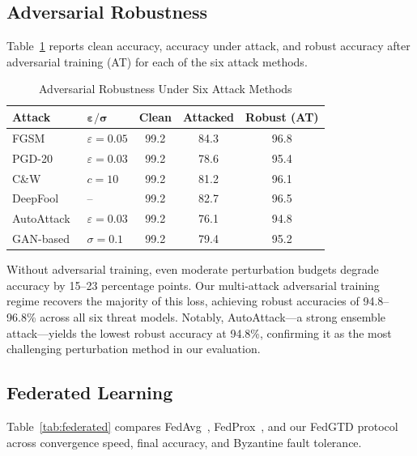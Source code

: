 \documentclass[journal,twoside]{IEEEtran}
\begin{document}
\subsection{Adversarial Robustness}

Table~\ref{tab:adversarial} reports clean accuracy, accuracy under attack, and robust accuracy after adversarial training (AT) for each of the six attack methods.

\begin{table}[!t]
\centering
\caption{Adversarial Robustness Under Six Attack Methods}
\label{tab:adversarial}
\renewcommand{\arraystretch}{1.15}
\begin{tabular}{@{}llccc@{}}
\toprule
\textbf{Attack} & $\boldsymbol{\varepsilon / \sigma}$ & \textbf{Clean} & \textbf{Attacked} & \textbf{Robust (AT)} \\
\midrule
FGSM~\cite{Goodfellow2015}   & $\varepsilon{=}0.05$ & 99.2 & 84.3 & 96.8 \\
PGD-20~\cite{Madry2018}      & $\varepsilon{=}0.03$ & 99.2 & 78.6 & 95.4 \\
C\&W~\cite{Carlini2017}      & $c{=}10$             & 99.2 & 81.2 & 96.1 \\
DeepFool~\cite{Moosavi2016}  & --                   & 99.2 & 82.7 & 96.5 \\
AutoAttack~\cite{Croce2020}  & $\varepsilon{=}0.03$ & 99.2 & 76.1 & 94.8 \\
GAN-based~\cite{Lin2022}     & $\sigma{=}0.1$       & 99.2 & 79.4 & 95.2 \\
\bottomrule
\end{tabular}
\end{table}

Without adversarial training, even moderate perturbation budgets degrade accuracy by 15--23 percentage points. Our multi-attack adversarial training regime recovers the majority of this loss, achieving robust accuracies of 94.8--96.8\% across all six threat models. Notably, AutoAttack---a strong ensemble attack---yields the lowest robust accuracy at 94.8\%, confirming it as the most challenging perturbation method in our evaluation.

\subsection{Federated Learning}

Table~\ref{tab:federated} compares FedAvg~\cite{McMahan2017}, FedProx~\cite{Li2020FedProx}, and our FedGTD protocol across convergence speed, final accuracy, and Byzantine fault tolerance.
\end{document}
